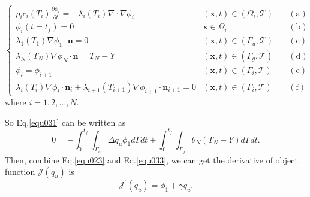 \documentclass[UTF-8]{article}
\begin{document}
\begin{equation}\label{equ032}
	\left\{
	\begin{array}{lll}
		\rho_i c_i(T_i) \frac{\partial \phi_i}{\partial t}  = - \lambda_i(T_i) \nabla \cdot \nabla \phi_i \quad &(\pmb{x},t) \in (\Omega_i, \mathcal{T}) \quad &(\text{a}) \\
		\phi_i(t = t_f) = 0 & \pmb{x} \in \Omega_i & (\text{b}) \\
		\lambda_1(T_1)\nabla\phi_1\cdot\pmb{n} = 0 & (\pmb{x},t) \in (\Gamma_u,\mathcal{T}) & (\text{c}) \\
		\lambda_N(T_N)\nabla\phi_N\cdot\pmb{n} = T_N - Y & (\pmb{x},t) \in (\Gamma_g, \mathcal{T}) & (\text{d}) \\
		\phi_i = \phi_{i+1} & (\pmb{x},t) \in (\Gamma_i,\mathcal{T}) & (\text{e}) \\
		\lambda_i(T_i)\nabla\phi_i\cdot\pmb{n}_i + \lambda_{i+1}(T_{i+1})\nabla\phi_{i+1}\cdot\pmb{n}_{i+1} = 0 & (\pmb{x},t) \in (\Gamma_i,\mathcal{T}) &(\text{f}) 
	\end{array}
	\right.
\end{equation}
where $i = 1,2,\dots,N$.

So Eq.\ref{equ031} can be written as
\begin{equation}\label{equ033}
	 0 = - \int_0^{t_f} \int_{\Gamma_u} \Delta q_u \phi_1 d\Gamma dt + \int_0^{t_f} \int_{\Gamma_g} \theta_N (T_N - Y) d\Gamma dt.
\end{equation}
Then, combine Eq.\ref{equ023} and Eq.\ref{equ033}, we can get the derivative of object function $\mathcal{J}(q_u)$ is
\begin{equation}
	\mathcal{J}^\prime (q_u) = \phi_1 + \gamma q_u.
\end{equation}
\end{document}
